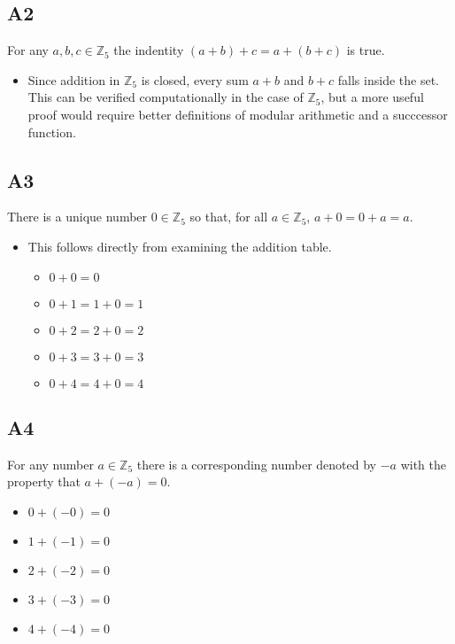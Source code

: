 \documentclass{article}
\begin{document}
\subsection{A2}

For any $a, b, c\in\mathbb{Z}_5$ the indentity $(a+b)+c=a+(b+c)$ is true.

\begin{itemize}
    \item Since addition in $\mathbb{Z}_5$ is closed, every sum $a+b$ and $b+c$ falls inside the set.  This can be verified computationally in the case of $\mathbb{Z}_5$, but a more useful proof would require better definitions of modular arithmetic and a succcessor function.
\end{itemize}

\subsection{A3}

There is a unique number $0\in\mathbb{Z}_5$ so that, for all $a\in\mathbb{Z}_5$, $a+0=0+a=a$.

\begin{itemize}
    \item This follows directly from examining the addition table.
    \begin{itemize}
        \item[\ding{217}] $0+0=0$
        \item[\ding{217}] $0+1=1+0=1$
        \item[\ding{217}] $0+2=2+0=2$
        \item[\ding{217}] $0+3=3+0=3$
        \item[\ding{217}] $0+4=4+0=4$
    \end{itemize}
\end{itemize}


\subsection{A4}

For any number $a\in\mathbb{Z}_5$ there is a corresponding number denoted by $-a$ with the property that $a+(-a)=0$.

\begin{itemize}
	\item $0+(-0)=0$
	\item $1+(-1)=0$
	\item $2+(-2)=0$
	\item $3+(-3)=0$
	\item $4+(-4)=0$
\end{itemize}
\end{document}
